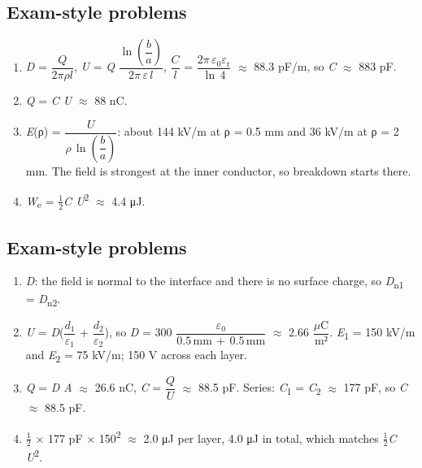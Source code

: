 \documentclass[11pt]{article}
\begin{document}
\begin{keepsection}\subsection{Exam-style problems}

\begin{enumerate}
\item \textit{D} = {\small\ensuremath{\dfrac{{Q}}{2πρ{l}}}}, \textit{U} = \textit{Q} {\small\ensuremath{\dfrac{\ln (\dfrac{{b}}{{a}})}{2π\, ε\, {l}}}}, {\small\ensuremath{\dfrac{{C}}{{l}}}} = {\small\ensuremath{\dfrac{2π\, ε_{0}ε_{\mathrm{r}}}{\ln \, 4}}} \ensuremath{\approx} 88.3 pF/m, so \textit{C} \ensuremath{\approx} 883 pF.
\item \textit{Q} = \textit{C U} \ensuremath{\approx} 88 nC.
\item \textit{E}(ρ) = {\small\ensuremath{\dfrac{{U}}{ρ\, \ln (\dfrac{{b}}{{a}})}}}: about 144 kV/m at ρ = 0.5 mm and 36 kV/m at ρ = 2 mm. The field is strongest at the inner conductor, so breakdown starts there.
\item \textit{W}\textsubscript{e} = \ensuremath{\tfrac12}\textit{C U}\textsuperscript{2} \ensuremath{\approx} 4.4 μJ.
\end{enumerate}

\end{keepsection}
\begin{keepsection}\subsection{Exam-style problems}

\begin{enumerate}
\item \textit{D}: the field is normal to the interface and there is no surface charge, so \textit{D}\textsubscript{n1} = \textit{D}\textsubscript{n2}.
\item \textit{U} = \textit{D}({\small\ensuremath{\dfrac{{d}_{1}}{ε_{1}}}} + {\small\ensuremath{\dfrac{{d}_{2}}{ε_{2}}}}), so \textit{D} = 300 {\small\ensuremath{\dfrac{ε_{0}}{0.5\, \text{mm}\, +\, 0.5\, \text{mm}}}} \ensuremath{\approx} 2.66 {\small\ensuremath{\dfrac{μ\mathrm{C}}{\mathrm{m}²}}}. \textit{E}\textsubscript{1} = 150 kV/m and \textit{E}\textsubscript{2} = 75 kV/m; 150 V across each layer.
\item \textit{Q} = \textit{D A} \ensuremath{\approx} 26.6 nC, \textit{C} = {\small\ensuremath{\dfrac{{Q}}{{U}}}} \ensuremath{\approx} 88.5 pF. Series: \textit{C}\textsubscript{1} = \textit{C}\textsubscript{2} \ensuremath{\approx} 177 pF, so \textit{C} \ensuremath{\approx} 88.5 pF.
\item \ensuremath{\tfrac12} \ensuremath{\times} 177 pF \ensuremath{\times} 150\textsuperscript{2} \ensuremath{\approx} 2.0 μJ per layer, 4.0 μJ in total, which matches \ensuremath{\tfrac12}\textit{C U}\textsuperscript{2}.
\end{enumerate}

\end{keepsection}
\end{document}
